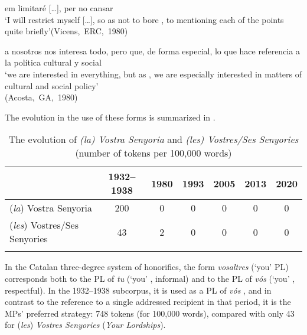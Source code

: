 \documentclass[output=paper]{langscibook}
\begin{document}
\ea\label{ex:nogue:25}
 \ea\label{ex:nogue:25a}
{{em limitaré} […]{, per no cansar} }\\
\glt `I will restrict myself […], so as not to bore  , to mentioning each of the points quite briefly'\hfill\hbox{(Vicens, ERC, 1980)}

 \ex\label{ex:nogue:25b}
{{a nosotros nos interesa todo, pero}  {que, de forma especial, lo que hace referencia a la política cultural y social}}\\
\glt `we are interested in everything, but as   , we are especially interested in matters of cultural and social policy'\\
\hfill\hbox{(Acosta, GA, 1980)}\\
\z \z


The evolution in the use of these forms is summarized in .


\begin{table}
\begin{tabular}{ccccccc}
\lsptoprule
& {1932–1938} & {1980} & {1993} & {2005} & {2013} & {{2020}}\\
\midrule
\multicolumn{1}{l}{{(\textit{la}}{) {Vostra} {Senyoria}}} & {200} & {0} & {0} & {0} & {0} & {0}\\
\multicolumn{1}{l}{{(\textit{les}}{) {Vostres}/{Ses} {Senyories}}} & {43} & {2} & {0} & {0} & {0} & {0}\\
\lspbottomrule
\end{tabular}
\caption{The evolution of \textit{(la) Vostra Senyoria} and \textit{(les) Vostres\slash Ses Senyories} (number of tokens per 100,000 words)}
\label{tab:nogue:10}
\end{table}


\label{sec:nogue:2.2.1.5}





In the Catalan three-degree system of honorifics, the form \textit{vosaltres} (`you' PL) corresponds both to the PL of \textit{tu} (`you' , informal) and to the PL of \textit{vós} (`you' , respectful). In the 1932–1938 subcorpus, it is used as a PL of \textit{vós} , and in contrast to the reference to a single addressed recipient in that period, it is the MPs’ preferred strategy: 748 tokens (for 100,000 words), compared with only 43 for (\textit{les}) \textit{Vostres Senyories} (\textit{Your Lordships}).
\end{document}
